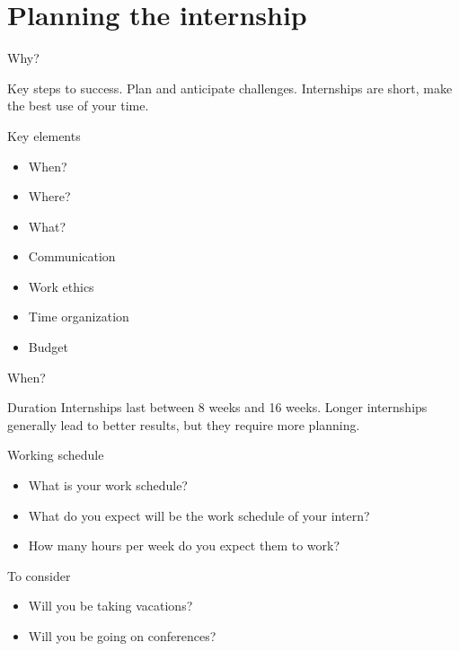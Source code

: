 \documentclass[t, 11pt,xcolor=dvipsnames]{beamer}
\begin{document}
\section{Planning the internship}

\begin{frame}[fragile]{Why?}

	Key steps to success. Plan and anticipate challenges. Internships are short, make the best use of your time.
	
	\begin{block}{Key elements}
		\begin{itemize}
		\item When?
		\item Where?
		\item What?
		\item Communication
		\item Work ethics
		\item Time organization
		\item Budget
		\end{itemize}
	\end{block}
\end{frame}

\begin{frame}{When?}

	\begin{block}{Duration}
		Internships last between 8 weeks and 16 weeks.  Longer internships generally lead to better results, but they require more planning. 
	\end{block}

	{
	\begin{block}{Working schedule}
		\begin{itemize}
			\item What is your work schedule? 
			\item What do you expect will be the work schedule of your intern?
			\item How many hours per week do you expect them to work?
		\end{itemize}
	\end{block}
	}

	{
	\begin{block}{To consider}
		\begin{itemize}
			\item Will you be taking vacations? 
			\item Will you be going on conferences? 
		\end{itemize}
	\end{block}
	}


\end{frame}
\end{document}
